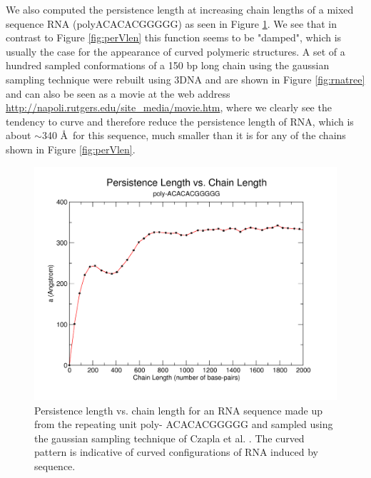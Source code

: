 We also computed the persistence length at increasing chain lengths of
a   mixed   sequence  RNA   (polyACACACGGGGG)   as   seen  in   Figure
\ref{fig:curved}. We see that  in contrast to Figure \ref{fig:perVlen}
this function seems to be "damped",  which is usually the case for the
appearance of curved polymeric structures.  A set of a hundred sampled
conformations  of a  150 bp  long  chain using  the gaussian  sampling
technique   were  rebuilt  using   3DNA  and   are  shown   in  Figure
\ref{fig:rnatree} and can  also be seen as a movie  at the web address
\url{http://napoli.rutgers.edu/site_media/movie.htm}, where we clearly
see the tendency to curve  and therefore reduce the persistence length
of RNA, which  is about $\sim$340 \AA~for  this sequence, much smaller
than it is for any of the chains shown in Figure \ref{fig:perVlen}.

\begin{figure}
\centering
\includegraphics[angle=0, scale=0.6]{Chapter4/dampedlike.png}
\caption{Persistence length vs. chain  length for an RNA sequence made
  up from the  repeating unit poly- ACACACGGGGG and  sampled using the
  gaussian sampling technique of  Czapla et al. \cite{czapla2006}. The
  curved pattern is indicative of curved configurations of RNA induced
  by sequence.}
\label{fig:curved}
\end{figure}

